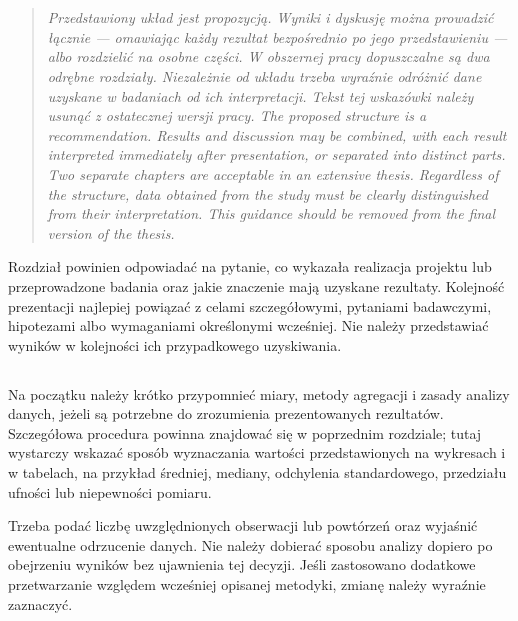 \chapter{}


\begin{quote}
\itshape
\ploren
  {Przedstawiony układ jest propozycją. Wyniki i dyskusję można prowadzić łącznie — omawiając każdy rezultat bezpośrednio po jego przedstawieniu — albo rozdzielić na osobne części. W obszernej pracy dopuszczalne są dwa odrębne rozdziały. Niezależnie od układu trzeba wyraźnie odróżnić dane uzyskane w badaniach od ich interpretacji. Tekst tej wskazówki należy usunąć z ostatecznej wersji pracy.}
  {The proposed structure is a recommendation. Results and discussion may be combined, with each result interpreted immediately after presentation, or separated into distinct parts. Two separate chapters are acceptable in an extensive thesis. Regardless of the structure, data obtained from the study must be clearly distinguished from their interpretation. This guidance should be removed from the final version of the thesis.}
\end{quote}

Rozdział powinien odpowiadać na pytanie, co wykazała realizacja projektu lub przeprowadzone badania oraz jakie znaczenie mają uzyskane rezultaty. Kolejność prezentacji najlepiej powiązać z celami szczegółowymi, pytaniami badawczymi, hipotezami albo wymaganiami określonymi wcześniej. Nie należy przedstawiać wyników w kolejności ich przypadkowego uzyskiwania.

\section{}

Na początku należy krótko przypomnieć miary, metody agregacji i zasady analizy danych, jeżeli są potrzebne do zrozumienia prezentowanych rezultatów. Szczegółowa procedura powinna znajdować się w poprzednim rozdziale; tutaj wystarczy wskazać sposób wyznaczania wartości przedstawionych na wykresach i w tabelach, na przykład średniej, mediany, odchylenia standardowego, przedziału ufności lub niepewności pomiaru.

Trzeba podać liczbę uwzględnionych obserwacji lub powtórzeń oraz wyjaśnić ewentualne odrzucenie danych. Nie należy dobierać sposobu analizy dopiero po obejrzeniu wyników bez ujawnienia tej decyzji. Jeśli zastosowano dodatkowe przetwarzanie względem wcześniej opisanej metodyki, zmianę należy wyraźnie zaznaczyć.

